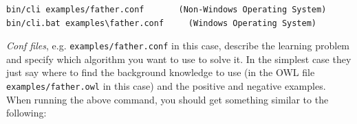 \documentclass[a4paper,12pt]{scrartcl}
\begin{document}
\begin{verbatim}
bin/cli examples/father.conf       (Non-Windows Operating System)
bin/cli.bat examples\father.conf     (Windows Operating System)
\end{verbatim}

\emph{Conf files}, e.g. \verb|examples/father.conf| in this case, describe the learning problem and specify which algorithm you want to use to solve it. In the simplest case they just say where to find the background knowledge to use (in the OWL file \verb|examples/father.owl| in this case) and the positive and negative examples. When running the above command, you should get something similar to the following:

\lstset{breaklines=true, breakatwhitespace=true}
\lstset{numbers=left, numberstyle=\scriptsize, basicstyle=\ttfamily\scriptsize}
\end{document}
